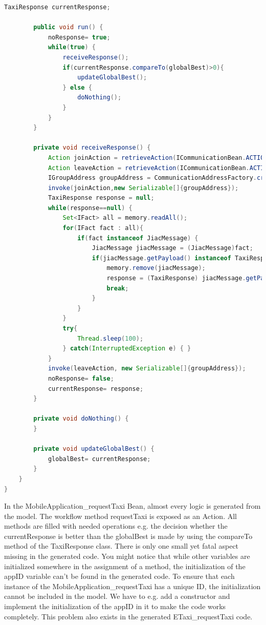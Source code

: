 \begin{lstlisting}[language=java, caption= Generated Agent Bean - MobileApplication\_requestTaxi]
		TaxiResponse currentResponse;
		
		public void run() {
			noResponse= true;
			while(true) {
				receiveResponse();
				if(currentResponse.compareTo(globalBest)>0){
					updateGlobalBest();
				} else {
					doNothing();
				}
			}
		}
	 
		private void receiveResponse() {
			Action joinAction = retrieveAction(ICommunicationBean.ACTION_JOIN_GROUP);
			Action leaveAction = retrieveAction(ICommunicationBean.ACTION_LEAVE_GROUP);
			IGroupAddress groupAddress = CommunicationAddressFactory.createGroupAddress("TaxiResponseTo"+appID+"");
			invoke(joinAction,new Serializable[]{groupAddress});
			TaxiResponse response = null;
			while(response==null) {
				Set<IFact> all = memory.readAll();
				for(IFact fact : all){
					if(fact instanceof JiacMessage) {
						JiacMessage jiacMessage = (JiacMessage)fact;
						if(jiacMessage.getPayload() instanceof TaxiResponse && jiacMessage.getHeader(IJiacMessage.Header.SEND_TO).equals("TaxiResponseTo"+appID+"")) {
							memory.remove(jiacMessage);
							response = (TaxiResponse) jiacMessage.getPayload();
							break;
						}
					}
				}
				try{
					Thread.sleep(100);
				} catch(InterruptedException e) { }
			}
			invoke(leaveAction, new Serializable[]{groupAddress});
			noResponse= false;
			currentResponse= response;
		}
	 
		private void doNothing() {
		}
	 
		private void updateGlobalBest() {
			globalBest= currentResponse;
		} 
	}
}
\end{lstlisting}

In the MobileApplication\_requestTaxi Bean, almost every logic is generated from the model. The workflow method requestTaxi is exposed as an Action. All methods are filled with needed operations e.g. the decision whether the currentResponse is better than the globalBest is made by using the compareTo method of the TaxiResponse class. There is only one small yet fatal aspect missing in the generated code. You might notice that while other variables are initialized somewhere in the assignment of a method, the initialization of the appID variable can't be found in the generated code. To ensure that each instance of the MobileApplication\_requestTaxi has a unique ID, the initialization cannot be included in the model. We have to e.g. add a constructor and implement the initialization of the appID in it to make the code works completely. This problem also exists in the generated ETaxi\_requestTaxi code.

